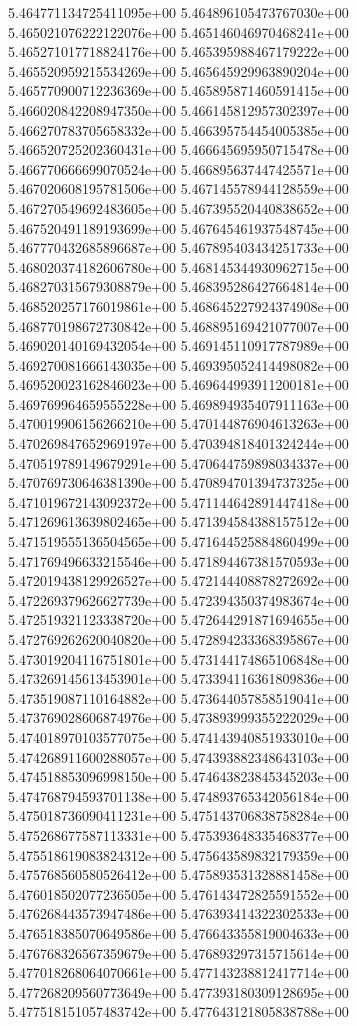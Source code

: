 5.464771134725411095e+00
5.464896105473767030e+00
5.465021076222122076e+00
5.465146046970468241e+00
5.465271017718824176e+00
5.465395988467179222e+00
5.465520959215534269e+00
5.465645929963890204e+00
5.465770900712236369e+00
5.465895871460591415e+00
5.466020842208947350e+00
5.466145812957302397e+00
5.466270783705658332e+00
5.466395754454005385e+00
5.466520725202360431e+00
5.466645695950715478e+00
5.466770666699070524e+00
5.466895637447425571e+00
5.467020608195781506e+00
5.467145578944128559e+00
5.467270549692483605e+00
5.467395520440838652e+00
5.467520491189193699e+00
5.467645461937548745e+00
5.467770432685896687e+00
5.467895403434251733e+00
5.468020374182606780e+00
5.468145344930962715e+00
5.468270315679308879e+00
5.468395286427664814e+00
5.468520257176019861e+00
5.468645227924374908e+00
5.468770198672730842e+00
5.468895169421077007e+00
5.469020140169432054e+00
5.469145110917787989e+00
5.469270081666143035e+00
5.469395052414498082e+00
5.469520023162846023e+00
5.469644993911200181e+00
5.469769964659555228e+00
5.469894935407911163e+00
5.470019906156266210e+00
5.470144876904613263e+00
5.470269847652969197e+00
5.470394818401324244e+00
5.470519789149679291e+00
5.470644759898034337e+00
5.470769730646381390e+00
5.470894701394737325e+00
5.471019672143092372e+00
5.471144642891447418e+00
5.471269613639802465e+00
5.471394584388157512e+00
5.471519555136504565e+00
5.471644525884860499e+00
5.471769496633215546e+00
5.471894467381570593e+00
5.472019438129926527e+00
5.472144408878272692e+00
5.472269379626627739e+00
5.472394350374983674e+00
5.472519321123338720e+00
5.472644291871694655e+00
5.472769262620040820e+00
5.472894233368395867e+00
5.473019204116751801e+00
5.473144174865106848e+00
5.473269145613453901e+00
5.473394116361809836e+00
5.473519087110164882e+00
5.473644057858519041e+00
5.473769028606874976e+00
5.473893999355222029e+00
5.474018970103577075e+00
5.474143940851933010e+00
5.474268911600288057e+00
5.474393882348643103e+00
5.474518853096998150e+00
5.474643823845345203e+00
5.474768794593701138e+00
5.474893765342056184e+00
5.475018736090411231e+00
5.475143706838758284e+00
5.475268677587113331e+00
5.475393648335468377e+00
5.475518619083824312e+00
5.475643589832179359e+00
5.475768560580526412e+00
5.475893531328881458e+00
5.476018502077236505e+00
5.476143472825591552e+00
5.476268443573947486e+00
5.476393414322302533e+00
5.476518385070649586e+00
5.476643355819004633e+00
5.476768326567359679e+00
5.476893297315715614e+00
5.477018268064070661e+00
5.477143238812417714e+00
5.477268209560773649e+00
5.477393180309128695e+00
5.477518151057483742e+00
5.477643121805838788e+00
